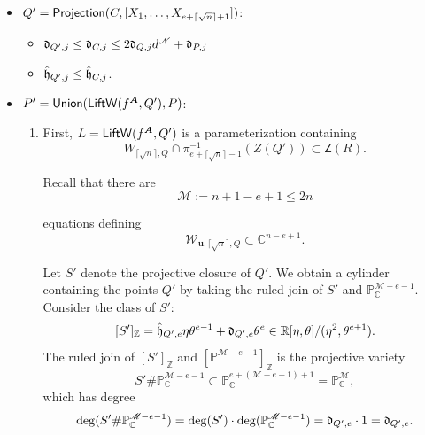 \documentclass[12pt]{article}
\def\mA{{\bm A}}
\newcommand{\ZZ}{{\mathbb{Z}}}
\def\C{\mathbb{C}}
\def\P{\mathbb{P}}
\def\fd{\frak{d}}
\def\fh{\frak{h}}
\def\Zeroes{\mathsf{Z}}
\def\LiftWL{{\sf LiftW}}
\def\Union{{\sf Union}}
\def\Projection{{\sf Projection}}
\def\mA{{\bm A}}
\def\C{\mathbb{C}}
\def\P{\mathbb{P}}
\begin{document}
\begin{itemize}
\begin{enumerate}
\item Now, $C = \Union(C,P):$
\begin{itemize}
    \item $\fd_{C,j} \leq 2\fd_{Q,j}d^{\mathscr{N}} + \fd_{P,j}$
    \item $\hat{\fh}_{C,j} \leq 2\left(\hat{\fh}_{Q,j}d^{\mathscr{N}} + \fd_{Q,j} \mathscr{N}d^{\mathscr{N}-1}(\log(\mathscr{N}+1)d + H)\right) \\+  (\hat{\fh}_{P,j}+n(12\log(2n+1)+h_{\mA})\fd_{P,j})$
\end{itemize}
%
\end{enumerate}







\item $Q' = \Projection(C, [X_1, \hdots , X_{e+\lceil \sqrt{n} \rceil+1}])$:
%
%
\begin{itemize}
    \item $\fd_{Q',j} \leq \fd_{C,j} \leq 2\fd_{Q,j}d^{\mathscr{N}} + \fd_{P,j}$
    \item $\hat{\fh}_{Q',j} \leq  \hat{\fh}_{C,j}$.
\end{itemize}
%

\item $P' = \Union(\LiftWL(f^{\mA},Q'),P)$: 
\begin{enumerate}
    \item First, $L = \LiftWL(f^{\mA},Q')$ is a parameterization containing 
        \[
        W_{\lceil \sqrt{n} \rceil , Q} \cap \pi_{e+\lceil \sqrt{n} \rceil -1}^{-1}(Z(Q')) \subset \Zeroes(R).
        \] 

        
%
Recall that there are 
\[
\mathscr{M}:=n+1-e+1 \leq 2n
\]

equations defining 
%
\begin{equation}\label{eq:LW2m}
\mathscr{W}_{\bm u,\lceil \sqrt{n} \rceil,Q} \subset \mathbb{C}^{n-e+1}.
\end{equation}
%





Let $S'$ denote the projective closure of $Q'$. We obtain a cylinder containing the points $Q'$ by taking the ruled join of $S'$ and $\P_{\C}^{\mathscr{M}-e-1}$. Consider the class of $S':$ 
%
\begin{equation}\label{eq:cylCannym}
    [S']_{\ZZ} = \hat{\fh}_{Q',e}\eta \theta^{e-1} + \fd_{Q',e} \theta^e \in \mathbb{R}[\eta,\theta]/(\eta^2,\theta^{e+1}).
\end{equation}
%
The ruled join of $[S']_{\ZZ}$ and $[\P^{\mathscr{M}-e-1}]_{\ZZ}$ is the projective variety \[S' \# \P_{\C}^{\mathscr{M}-e-1} \subset \P_{\C}^{e + (\mathscr{M}-e-1) +1}
=
\P_{\C}^\mathscr{M},\] 
which has degree 
\[
\deg (S' \# \P_{\C}^{\mathscr{M}-e-1}) = \deg( S') \cdot \deg (\P_{\C}^{\mathscr{M}-e-1})= \fd_{Q',e} \cdot 1 = \fd_{Q',e}.
\] 




\end{enumerate}
\end{itemize}
\end{document}
